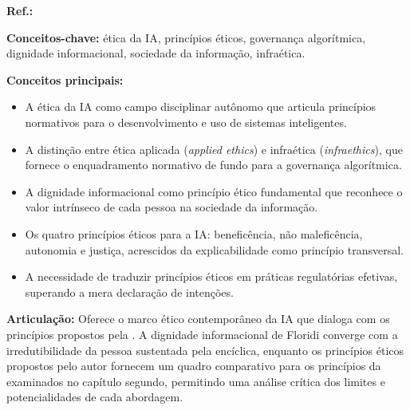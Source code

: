 \begin{fichamento}
    \textbf{Ref.:} \cite{Floridi2023EI}
    
    \textbf{Conceitos-chave:} ética da IA, princípios éticos, governança algorítmica, dignidade informacional, sociedade da informação, infraética.
    
    \textbf{Conceitos principais:}
    \begin{itemize}
        \item A ética da IA como campo disciplinar autônomo que articula princípios normativos para o desenvolvimento e uso de sistemas inteligentes.
        \item A distinção entre ética aplicada (\textit{applied ethics}) e infraética (\textit{infraethics}), que fornece o enquadramento normativo de fundo para a governança algorítmica.
        \item A dignidade informacional como princípio ético fundamental que reconhece o valor intrínseco de cada pessoa na sociedade da informação.
        \item Os quatro princípios éticos para a IA: beneficência, não maleficência, autonomia e justiça, acrescidos da explicabilidade como princípio transversal.
        \item A necessidade de traduzir princípios éticos em práticas regulatórias efetivas, superando a mera declaração de intenções.
    \end{itemize}
    
    \textbf{Articulação:} Oferece o marco ético contemporâneo da IA que dialoga com os princípios propostos pela \MH{}. A dignidade informacional de Floridi converge com a irredutibilidade da pessoa sustentada pela encíclica, enquanto os princípios éticos propostos pelo autor fornecem um quadro comparativo para os princípios da \MH{} examinados no capítulo segundo, permitindo uma análise crítica dos limites e potencialidades de cada abordagem.
\end{fichamento}


